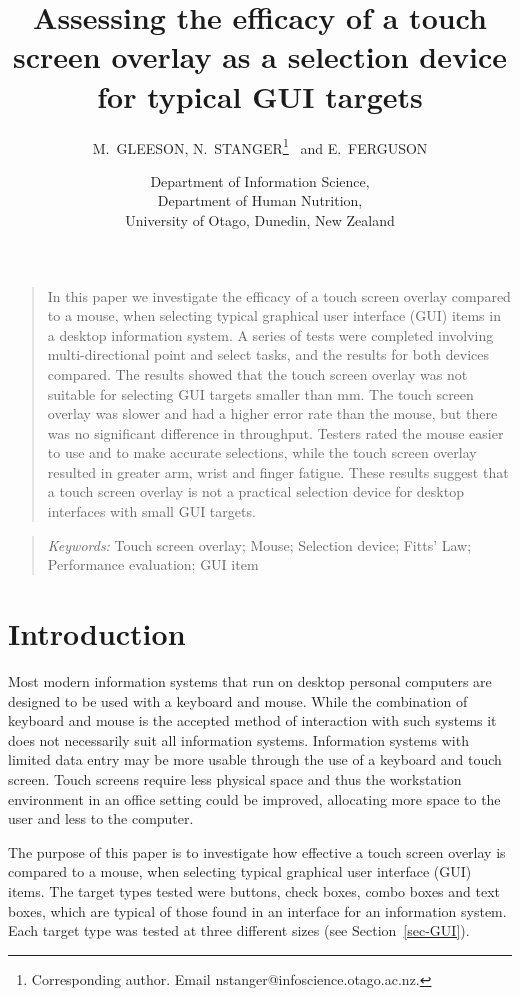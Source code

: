 \documentclass[a4paper]{article}
\title{\textbf{Assessing the efficacy of a touch screen overlay as a selection
device for typical GUI targets}}
\author{M.\ GLEESON\dag, N.\ STANGER\thanks{Corresponding author. Email nstanger@infoscience.otago.ac.nz.} \dag\ and E.\ FERGUSON\ddag}
\date{\dag Department of Information Science, \\
	\ddag Department of Human Nutrition, \\
	University of Otago, Dunedin, New Zealand}
\begin{document}
\renewcommand{\baselinestretch}{2}

\maketitle

\begin{quotation}
	\noindent In this paper we investigate the efficacy of a touch
	screen overlay compared to a mouse, when selecting typical graphical
	user interface (GUI) items in a desktop information system. A series
	of tests were completed involving multi-directional point and select
	tasks, and the results for both devices compared. The results showed
	that the touch screen overlay was not suitable for selecting GUI
	targets smaller than \unit[4]{mm}. The touch screen overlay was
	slower and had a higher error rate than the mouse, but there was no
	significant difference in throughput. Testers rated the mouse easier
	to use and to make accurate selections, while the touch screen
	overlay resulted in greater arm, wrist and finger fatigue. These
	results suggest that a touch screen overlay is not a practical
	selection device for desktop interfaces with small GUI targets.
\end{quotation}

\begin{quotation}
	\noindent \emph{Keywords:} Touch screen overlay; Mouse; Selection
	device; Fitts' Law; Performance evaluation; GUI item
\end{quotation}

\newcommand{\ISOnine}{ISO 9241-9}


\section{Introduction}
\label{sec-introduction}

Most modern information systems that run on desktop personal computers
are designed to be used with a keyboard and mouse. While the combination
of keyboard and mouse is the accepted method of interaction with such
systems it does not necessarily suit all information systems.
Information systems with limited data entry may be more usable through
the use of a keyboard and touch screen. Touch screens require less
physical space and thus the workstation environment in an office setting
could be improved, allocating more space to the user and less to the
computer.

The purpose of this paper is to investigate how effective a touch screen
overlay is compared to a mouse, when selecting typical graphical user
interface (GUI) items. The target types tested were buttons, check
boxes, combo boxes and text boxes, which are typical of those found in
an interface for an information system. Each target type was tested at
three different sizes (see Section~\ref{sec-GUI}).
\end{document}
